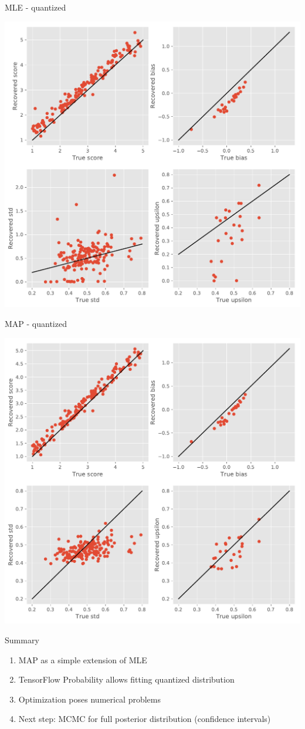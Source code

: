 \documentclass{beamer}
\begin{document}
\begin{frame}{MLE - quantized}
	\begin{center}
		\includegraphics[width=0.6\linewidth]{mlequnta}
	\end{center}
\end{frame}
\begin{frame}{MAP - quantized}
\begin{center}
	\includegraphics[width=0.6\linewidth]{mapquanta}
\end{center}
\end{frame}

\begin{frame}{Summary}
\begin{enumerate}
	\item MAP as a simple extension of MLE
	\item TensorFlow Probability allows fitting quantized distribution
	\item Optimization poses numerical problems 
	\item Next step: MCMC for full posterior distribution (confidence intervals) 
\end{enumerate}
\end{frame}
	
\end{document}
